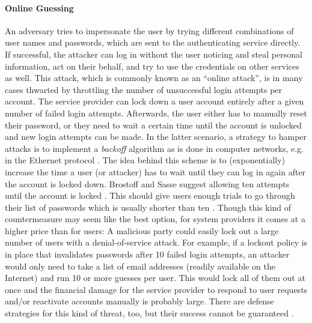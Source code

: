 \paragraph{Online Guessing} 
An adversary tries to impersonate the user by trying different combinations of user names and passwords, which are sent to the authenticating service directly. If successful, the attacker can log in without the user noticing and steal personal information, act on their behalf, and try to use the credentials on other services as well. 
	This attack, which is commonly known as an ``online attack'', is in many cases thwarted by throttling the number of unsuccessful login attempts per account. The service provider can lock down a user account entirely after a given number of failed login attempts. Afterwards, the user either has to manually reset their password, or they need to wait a certain time until the account is unlocked and new login attempts can be made. In the latter scenario, a strategy to hamper attacks is to implement a \textit{backoff} algorithm as is done in computer networks, e.g. in the Ethernet protocol \cite[p. 285]{Tanenbaum2011ComputerNetworks}. The idea behind this scheme is to (exponentially) increase the time a user (or attacker) has to wait until they can log in again after the account is locked down. Brostoff and Sasse suggest allowing ten attempts until the account is locked \cite{Brostoff2003TenStrikes}. This should give users enough trials to go through their list of passwords which is usually shorter than ten \cite{Florencio2007LargeScaleStudyPasswordHabits}. Though this kind of countermeasure may seem like the best option, for system providers it comes at a higher price than for users: A malicious party could easily lock out a large number of users with a denial-of-service attack. For example, if a lockout policy is in place that invalidates passwords after 10 failed login attempts, an attacker would only need to take a list of email addresses (readily available on the Internet) and run 10 or more guesses per user. This would lock all of them out at once and the financial damage for the service provider to respond to user requests and/or reactivate accounts manually is probably large. There are defense strategies for this kind of threat, too, but their success cannot be guaranteed \cite{Florencio2010WhereDoPoliciesComeFrom}.
	
